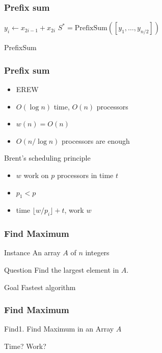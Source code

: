 \documentclass[12pt,aspectratio=169]{beamer}
\begin{document}
\begin{frame}\frametitle{Prefix sum}
\begin{algorithm}[H]

{
  $y_{i}\gets x_{2i-1} + x_{2i}$\;
}
$S^{*} = \text{PrefixSum}([y_{1}, \ldots , y_{n/2}])$\;
{
}
\caption{PrefixSum}
\end{algorithm}
\end{frame}


\begin{frame}\frametitle{Prefix sum}
  \begin{itemize}
  \item
    EREW
  \item
    $O(\log n)$ time, $O(n)$ processors
  \item
    $w(n) = O(n)$
  \item
    $O(n/\log n)$ processors are enough
  \end{itemize}

\begin{block}{Brent's scheduling principle}
  \begin{itemize}
  \item
    $w$ work on $p$ processors in time $t$
  \item
    $p_{1}<p$
  \item
    time $\lfloor w/p_{i}\rfloor +t$, work $w$
  \end{itemize}
\end{block}
\end{frame}

\begin{frame}\frametitle{Find Maximum}
\begin{block}{Instance}
An array $A$ of $n$ integers
\end{block}
\begin{block}{Question}
Find the largest element in $A$.    
\end{block}
\begin{block}{Goal}
Fastest algorithm
\end{block}
\end{frame}

\begin{frame}\frametitle{Find Maximum}
\begin{algorithm}[H]
\caption{Find1.    
Find Maximum in an Array $A$}
\end{algorithm}
Time? Work? 
\end{frame}
\end{document}
